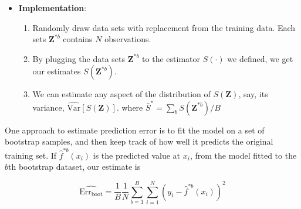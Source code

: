 \documentclass[12pt,a4paper]{article}%
\theoremstyle{definition}
\theoremstyle{plain}
\numberwithin{equation}{section}
\begin{document}
\begin{itemize}
\item \textbf{Implementation}:
	\begin{enumerate}
	\item Randomly draw data sets with replacement from the training data. Each sets $\boldsymbol{Z}^{*b}$ contains $N$ observations.
	\item By plugging the data sets $\boldsymbol{Z}^{*b}$ to the estimator $S(\cdot)$ we defined, we get our estimates $S(\boldsymbol{Z}^{*b})$. 
	\item We can estimate any aspect of the distribution of $S(\boldsymbol{Z})$, say, its variance, $\widehat{\text{Var}}[S(\boldsymbol{Z})].$ where $\bar{S}^{*} = \sum_{b} S(\boldsymbol{Z}^{*b})/B$
	\end{enumerate}
\end{itemize}

One approach to estimate prediction error is to fit the model on a set of bootstrap samples, and then keep track of how well it predicts the original training set. 
If $\hat{f}^{*b}(x_{i})$ is the predicted value at $x_{i}$, from the model fitted to the $b$th bootstrap dataset, our estimate is 

\begin{equation*}
\widehat{\text{Err}_{\text{boot}}} = \frac{1}{B} \frac{1}{N} \sum\limits_{b=1}^{B} \sum\limits_{i=1}^{N} (y_{i}-\hat{f}^{*b}(x_{i}))^{2}
\end{equation*}
\end{document}
